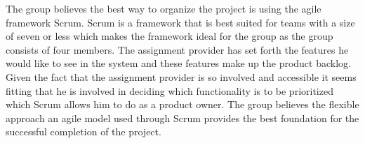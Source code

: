 The group believes the best way to organize the project is using the agile framework Scrum.
Scrum is a framework that is best suited for teams with a size of seven or less \cite{software-engineering-scrum-size} which makes the framework ideal for the group as the group consists of four members.
The assignment provider has set forth the features he would like to see in the system and these features make up the product backlog.
Given the fact that the assignment provider is so involved and accessible it seems fitting that he is involved in deciding which functionality is to be prioritized which Scrum allows him to do as a product owner.
The group believes the flexible approach an agile model used through Scrum provides the best foundation for the successful completion of the project.

